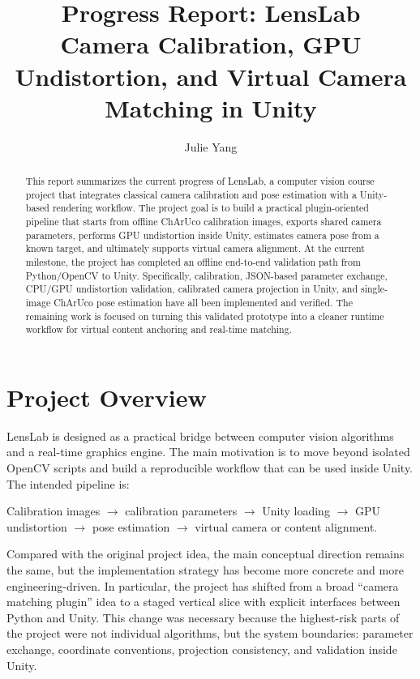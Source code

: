 \documentclass[10pt,twocolumn,letterpaper]{article}
\begin{document}
\title{Progress Report: LensLab\\Camera Calibration, GPU Undistortion, and Virtual Camera Matching in Unity}

\author{
Julie Yang
}
\maketitle

\begin{abstract}
This report summarizes the current progress of LensLab, a computer vision course project that integrates classical camera calibration and pose estimation with a Unity-based rendering workflow. The project goal is to build a practical plugin-oriented pipeline that starts from offline ChArUco calibration images, exports shared camera parameters, performs GPU undistortion inside Unity, estimates camera pose from a known target, and ultimately supports virtual camera alignment. At the current milestone, the project has completed an offline end-to-end validation path from Python/OpenCV to Unity. Specifically, calibration, JSON-based parameter exchange, CPU/GPU undistortion validation, calibrated camera projection in Unity, and single-image ChArUco pose estimation have all been implemented and verified. The remaining work is focused on turning this validated prototype into a cleaner runtime workflow for virtual content anchoring and real-time matching.
\end{abstract}

\section{Project Overview}

LensLab is designed as a practical bridge between computer vision algorithms and a real-time graphics engine. The main motivation is to move beyond isolated OpenCV scripts and build a reproducible workflow that can be used inside Unity. The intended pipeline is:

\begin{center}
Calibration images $\rightarrow$ calibration parameters $\rightarrow$ Unity loading $\rightarrow$ GPU undistortion $\rightarrow$ pose estimation $\rightarrow$ virtual camera or content alignment.
\end{center}

Compared with the original project idea, the main conceptual direction remains the same, but the implementation strategy has become more concrete and more engineering-driven. In particular, the project has shifted from a broad ``camera matching plugin'' idea to a staged vertical slice with explicit interfaces between Python and Unity. This change was necessary because the highest-risk parts of the project were not individual algorithms, but the system boundaries: parameter exchange, coordinate conventions, projection consistency, and validation inside Unity.
\end{document}
